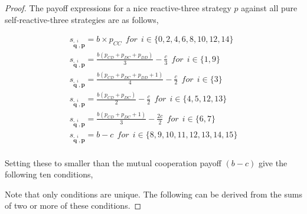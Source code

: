 \documentclass{article}
\theoremstyle{definition}
\begin{document}
\begin{proof}
  The payoff expressions for a nice reactive-three strategy $p$ against all
  pure self-reactive-three strategies are as follows,

\begin{equation}\label{Eq:PayoffExpressionsReactiveThree}
  \begin{array}{l}
    s_{\mathbf{\tilde{q}}^{i}, \mathbf{p}} = b \times p_{CC} ~~for~~ i \in \{0, 2, 4, 6, 8, 10, 12, 14\} \\ [1em]
    s_{\mathbf{\tilde{q}}^{i}, \mathbf{p}} = \frac{b (p_{CD} + p_{DC} + p_{DD})}{3} - \frac{c}{3} ~~for~~ i \in \{1, 9\} \\ [1em]
    s_{\mathbf{\tilde{q}}^{i}, \mathbf{p}} = \frac{b (p_{CD} + p_{DC} + p_{DD} + 1)}{4} - \frac{c}{2} ~~for~~ i \in \{3\} \\ [1em]
    s_{\mathbf{\tilde{q}}^{i}, \mathbf{p}} = \frac{b (p_{CD} + p_{DC})}{2} - \frac{c}{2} ~~for~~ i \in \{4, 5, 12, 13\} \\ [1em]
    s_{\mathbf{\tilde{q}}^{i}, \mathbf{p}} = \frac{b (p_{CD} + p_{DC} + 1)}{3} - \frac{2c}{2} ~~for~~ i \in \{6, 7\}\\ [1em]
    s_{\mathbf{\tilde{q}}^{i}, \mathbf{p}} = b - c ~~for~~ i \in \{8, 9, 10, 11, 12, 13, 14, 15\}\\
  \end{array}
\end{equation}

Setting these to smaller than the mutual cooperation payoff $(b - c)$ give the
following ten conditions,


Note that only conditions are unique. The following can be derived from the
sums of two or more of these conditions.

\end{proof}



\end{document}
